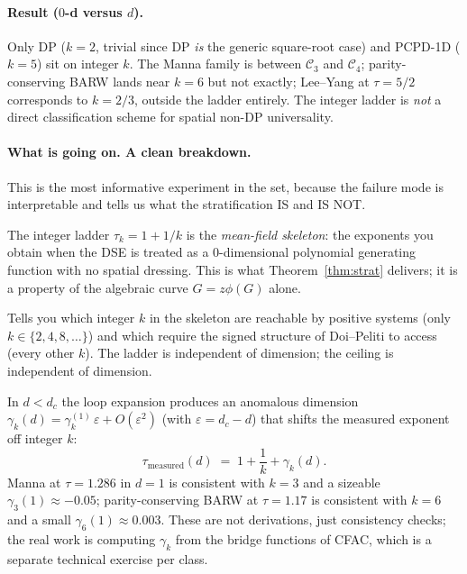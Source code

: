 \documentclass[11pt,a4paper]{article}
\theoremstyle{plain}
\theoremstyle{definition}
\begin{document}
\paragraph{Result ($0$-d versus $d$).}
Only DP ($k=2$, trivial since DP \emph{is} the generic
square-root case) and PCPD-1D ($k=5$) sit on integer $k$.  The
Manna family is between $\mathcal{C}_{3}$ and $\mathcal{C}_{4}$;
parity-conserving BARW lands near $k=6$ but not exactly;
Lee--Yang at $\tau=5/2$ corresponds to $k=2/3$, outside the
ladder entirely.  The integer ladder is \emph{not} a direct
classification scheme for spatial non-DP universality.

\paragraph{What is going on.  A clean breakdown.}
This is the most informative experiment in the set, because
the failure mode is interpretable and tells us what the
stratification IS and IS NOT.

\begin{description}[leftmargin=1.2em]
\item[Counting (analytic combinatorics).]
  The integer ladder $\tau_{k}=1+1/k$ is the \emph{mean-field
  skeleton}: the exponents you obtain when the DSE is treated
  as a $0$-dimensional polynomial generating function with no
  spatial dressing.  This is what Theorem~\ref{thm:strat}
  delivers; it is a property of the algebraic curve $G = z\phi(G)$
  alone.

\item[Maths (Banderier--Drmota).]
  Tells you which integer $k$ in the skeleton are reachable by
  positive systems (only $k\in\{2,4,8,\ldots\}$) and which
  require the signed structure of Doi--Peliti to access (every
  other $k$).  The ladder is independent of dimension; the
  ceiling is independent of dimension.

\item[Physics (renormalisation group / spatial dressing).]
  In $d < d_{c}$ the loop expansion produces an anomalous
  dimension $\gamma_{k}(d) = \gamma_{k}^{(1)}\,\varepsilon +
  O(\varepsilon^{2})$ (with $\varepsilon = d_{c}-d$) that
  shifts the measured exponent off integer $k$:
  \[
    \tau_{\mathrm{measured}}(d) \;=\; 1 + \frac{1}{k} +
    \gamma_{k}(d).
  \]
  Manna at $\tau=1.286$ in $d=1$ is consistent with
  $k=3$ and a sizeable $\gamma_{3}(1)\approx -0.05$;
  parity-conserving BARW at $\tau=1.17$ is consistent with
  $k=6$ and a small $\gamma_{6}(1)\approx 0.003$.  These are
  not derivations, just consistency checks; the real work is
  computing $\gamma_{k}$ from the bridge functions of CFAC,
  which is a separate technical exercise per class.
\end{description}
\end{document}
